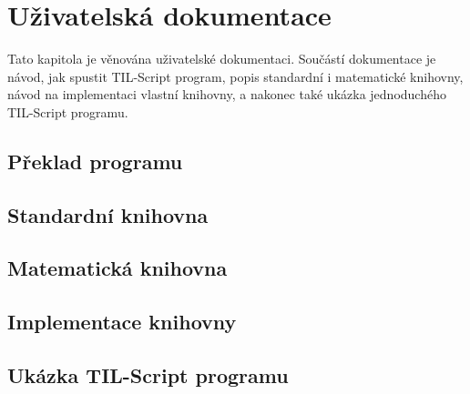 \chapter{Uživatelská dokumentace}

Tato kapitola je věnována uživatelské dokumentaci. Součástí dokumentace je návod, jak spustit
TIL-Script program, popis standardní i matematické knihovny, návod na implementaci vlastní knihovny,
a nakonec také ukázka jednoduchého TIL-Script programu.

\section{Překlad programu}

\section{Standardní knihovna}

\section{Matematická knihovna}

\section{Implementace knihovny}

\section{Ukázka TIL-Script programu}

\endinput
